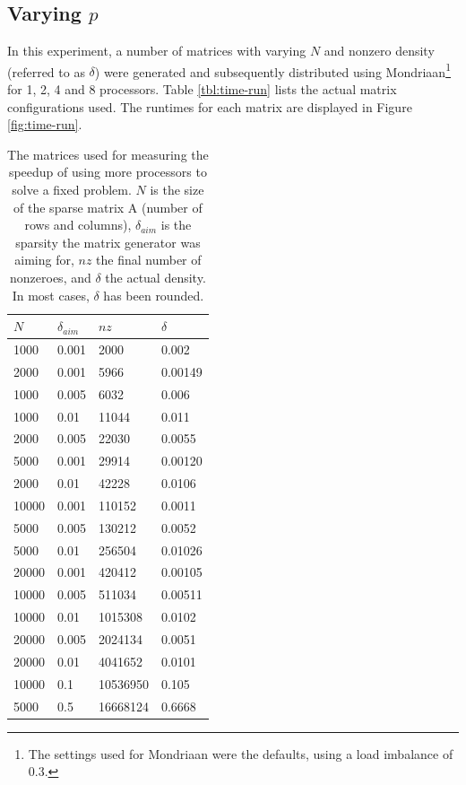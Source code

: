 \documentclass[a4paper]{article}
\begin{document}
\subsection{Varying $p$}\label{sec:time-run}

In this experiment, a number of matrices with varying $N$ and nonzero density (referred to as $\delta$) were generated and
subsequently distributed using Mondriaan\footnote{The settings used for Mondriaan
were the defaults, using a load imbalance of 0.3.} for 1, 2, 4 and 8 processors. Table \ref{tbl:time-run} lists the actual matrix configurations used. The runtimes for each matrix are displayed in Figure \ref{fig:time-run}.

\begin{table}
    \centering
    \begin{tabular}{l|l|l|l}
        $N$ & $\delta_{aim}$ & $nz$ & $\delta$ \\ \hline
1000  &  0.001   &   2000   &   0.002\\
2000  &  0.001   &   5966   &   0.00149\\
1000  &  0.005   &   6032   &   0.006\\
1000  &  0.01   &   11044   &   0.011\\
2000  &  0.005  &   22030   &   0.0055\\
5000  &  0.001   &   29914   &   0.00120\\
2000  &  0.01   &   42228   &   0.0106\\
10000  & 0.001    &   110152   &   0.0011\\
5000  &  0.005   &   130212   &   0.0052\\
5000  &  0.01  &   256504   &   0.01026\\
20000  & 0.001    &   420412   &   0.00105\\
10000  & 0.005   &   511034   &   0.00511\\
10000  & 0.01   &   1015308   &   0.0102\\
20000  & 0.005    &   2024134   &   0.0051\\
20000  & 0.01    &   4041652   &   0.0101\\
10000  & 0.1    &   10536950   &   0.105\\
5000  &  0.5   &   16668124   &   0.6668\\
    \end{tabular}
    \caption{The matrices used for measuring the speedup of using more processors to solve a fixed problem. $N$ is the size of the sparse matrix \mat A (number of rows and columns), $\delta_{aim}$ is the sparsity the matrix generator was aiming for, $nz$ the final number of nonzeroes, and $\delta$ the actual density. In most cases, $\delta$ has been rounded.}
    \label{tab:time-run}
\end{table}
\end{document}
